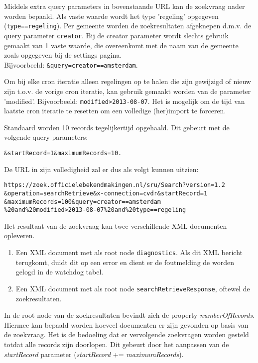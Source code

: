 Middels extra query parameters in bovenstaande URL kan de zoekvraag nader worden bepaald. Als vaste waarde wordt het type 'regeling' opgegeven (\texttt{type==regeling}). Per gemeente worden de zoekresultaten afgeknepen d.m.v. de query parameter \texttt{creator}. Bij de creator parameter wordt slechts gebruik gemaakt van 1 vaste waarde, die overeenkomt met de naam van de gemeente zoals opgegeven bij de settings pagina.
\\ Bijvoorbeeld: \texttt{\&query=creator==amsterdam}.

Om bij elke cron iteratie alleen regelingen op te halen die zijn gewijzigd of nieuw zijn t.o.v. de vorige cron iteratie, kan gebruik gemaakt worden van de parameter 'modified'. Bijvoorbeeld: \texttt{modified\textgreater2013-08-07}. Het is mogelijk om de tijd van laatste cron iteratie te resetten om een volledige (her)import te forceren.

Standaard worden 10 records tegelijkertijd opgehaald. Dit gebeurt met de volgende query parameters:
\begin{verbatim}
&startRecord=1&maximumRecords=10.
\end{verbatim}

De URL in zijn volledigheid zal er dus als volgt kunnen uitzien:

\begin{verbatim}
https://zoek.officielebekendmakingen.nl/sru/Search?version=1.2
&operation=searchRetrieve&x-connection=cvdr&startRecord=1
&maximumRecords=100&query=creator==amsterdam
%20and%20modified>2013-08-07%20and%20type==regeling
\end{verbatim}

Het resultaat van de zoekvraag kan twee verschillende XML documenten opleveren.

\begin{enumerate}
\item Een XML document met als root node \texttt{diagnostics}. Als dit XML bericht terugkomt, duidt dit op een error en dient er de foutmelding de worden gelogd in de watchdog tabel.
\item Een XML document met als root node \texttt{searchRetrieveResponse}, oftewel de zoekresultaten.
\end{enumerate}

In de root node van de zoekresultaten bevindt zich de property \emph{numberOfRecords}. Hiermee kan bepaald worden hoeveel documenten er zijn gevonden op basis van de zoekvraag. Het is de bedoeling dat er vervolgende zoekvragen worden gesteld totdat alle records zijn doorlopen. Dit gebeurt door het aanpassen van de \emph{startRecord} parameter (\emph{startRecord} += \emph{maximumRecords}).

